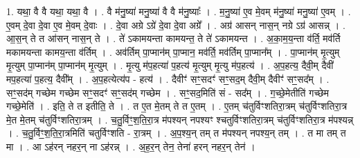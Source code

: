 \documentclass[17pt]{extarticle}
\begin{document}
1. यथा॒ वै वै यथा॒ यथा॒ वै । . वै म॑नु॒ष्या॑ मनु॒ष्या॑ वै वै म॑नु॒ष्याः᳚ । . म॒नु॒ष्या॑ ए॒व मे॒वम् म॑नु॒ष्या॑ मनु॒ष्या॑ ए॒वम् । . ए॒वम् दे॒वा दे॒वा ए॒व मे॒वम् दे॒वाः । . दे॒वा अग्रे ऽग्रे॑ दे॒वा दे॒वा अग्रे᳚ । . अग्र॑ आसन् नास॒न् नग्रे ऽग्र॑ आसन्न् । . आ॒स॒न् ते त आ॑सन् नास॒न् ते । . ते॑ ऽकामयन्ता कामयन्त॒ ते ते॑ ऽकामयन्त । . अ॒का॒म॒य॒न्ता व॑र्ति॒ मव॑र्ति मकामयन्ता कामय॒न्ता व॑र्तिम् । . अव॑र्तिम् पा॒प्मान॑म् पा॒प्मान॒ मव॑र्ति॒ मव॑र्तिम् पा॒प्मान᳚म् । . पा॒प्मान॑म् मृ॒त्युम् मृ॒त्युम् पा॒प्मान॑म् पा॒प्मान॑म् मृ॒त्युम् । . मृ॒त्यु म॑प॒हत्या॑ प॒हत्य॑ मृ॒त्युम् मृ॒त्यु म॑प॒हत्य॑ । . अ॒प॒हत्य॒ दैवी॒म् दैवी॑ मप॒हत्या॑ प॒हत्य॒ दैवी᳚म् । . अ॒प॒हत्येत्य॑प - हत्य॑ । . दैवीꣳ॑ सꣳ॒॒सदꣳ॑ सꣳ॒॒सद॒म् दैवी॒म् दैवीꣳ॑ सꣳ॒॒सद᳚म् । . सꣳ॒॒सद॑म् गच्छेम गच्छेम सꣳ॒॒सदꣳ॑ सꣳ॒॒सद॑म् गच्छेम । . सꣳ॒॒सद॒मिति॑ सं - सद᳚म् । . ग॒च्छे॒मेतीति॑ गच्छेम गच्छे॒मेति॑ । . इति॒ ते त इतीति॒ ते । . त ए॒त मे॒तम् ते त ए॒तम् । . ए॒तम् च॑तुर्विꣳशतिरा॒त्रम् च॑तुर्विꣳशतिरा॒त्र मे॒त मे॒तम् च॑तुर्विꣳशतिरा॒त्रम् । . च॒तु॒र्विꣳ॒॒श॒ति॒रा॒त्र म॑पश्यन् नपश्यꣳ श्चतुर्विꣳशतिरा॒त्रम् च॑तुर्विꣳशतिरा॒त्र म॑पश्यन्न् । . च॒तु॒र्विꣳ॒॒श॒ति॒रा॒त्रमिति॑ चतुर्विꣳशति - रा॒त्रम् । . अ॒प॒श्य॒न् तम् त म॑पश्यन् नपश्य॒न् तम् । . त मा तम् त मा । . आ ऽह॑रन् नहर॒न् ना ऽह॑रन्न् । . अ॒ह॒र॒न् तेन॒ तेना॑ हरन् नहर॒न् तेन॑ । \newline
\end{document}
